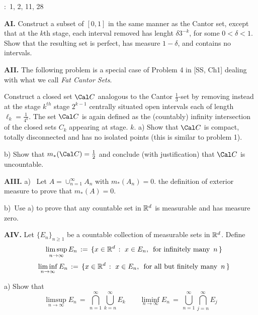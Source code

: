  

:\, 1, 2, 11, 28

\medskip


\medskip

{\bf AI.} Construct a subset of $[0,1]$ in the same manner as the Cantor set, except that at the $k$th stage, each interval removed has lenght $\delta 3^{-k}$, for some $0<\delta<1$. Show that the resulting set is perfect, has measure $1-\delta$, and contains no intervals.

\bigskip

{\bf AII.} The following problem is a special case of Problem 4 in [SS, Ch1] dealing with what we call {\it Fat Cantor Sets}. 

Construct a closed set $\Cal C$ analogous to the Cantor $\frac{1}{3}$-set by removing instead at the stage $k^{th}$ stage $2^{k-1}$ centrally situated open intervals each of length $\ell_k= \frac{1}{4^k}$.  The set 
$\Cal C$ is again defined as the (countably) infinity intersection of the closed sets $C_k$ appearing at stage.
 $k$.
  \smallskip
 a) Show that $\Cal C$ is compact, totally disconnected and has no isolated points (this is similar to problem 1).
 
 \smallskip
  b) Show that $m_{\ast}(\Cal C) = \frac{1}{2}$ and conclude (with justification) that $\Cal C$ is uncountable.

\bigskip
{\bf AIII.}   a) \, Let $ A = \cup_{n=1}^{\infty} A_n$ with $ m_{\ast}(A_n) = 0$.  the definition of exterior measure to prove that $m_{\ast}(A) =0$.

\smallskip

b)\, Use a) to prove that any countable set in $\Bbb R^d$ is measurable and has measure zero. 


\bigskip


{\bf AIV.}  Let $\{E_n\}_{n\geq 1}$ be a countable collection of measurable sets in $\Bbb R^d$. Define
$$  \quad  \limsup_{n \to \infty} E_n \,:=\, \{ x \in \Bbb R^d \, :\, \, x \in E_n, \, \text{ for infinitely many } \, n \, \} $$
$$  \quad  \liminf_{n \to \infty} E_n \,:=\, \{ x \in \Bbb R^d \, :\, \, x \in E_n, \, \text{ for all but finitely many } \, n \, \} $$
 
\smallskip 

a) Show that  $$\limsup_{n\to \infty} E_n \,=\, \bigcap_{n=1}^\infty \bigcup_{k=n}^{\infty} E_k \qquad \liminf_{n\to \infty} E_n \,=\, \bigcup_{n=1}^\infty \bigcap_{j=n}^{\infty} E_j $$

